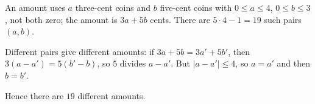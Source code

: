 An amount uses $a$ three-cent coins and $b$ five-cent coins with $0\le a\le4$, $0\le b\le3$, not both zero; the amount is $3a+5b$ cents. There are $5\cdot4-1=19$ such pairs $(a,b)$.

Different pairs give different amounts: if $3a+5b=3a'+5b'$, then $3(a-a')=5(b'-b)$, so $5$ divides $a-a'$. But $|a-a'|\le4$, so $a=a'$ and then $b=b'$.

Hence there are $\boxed{19}$ different amounts.
